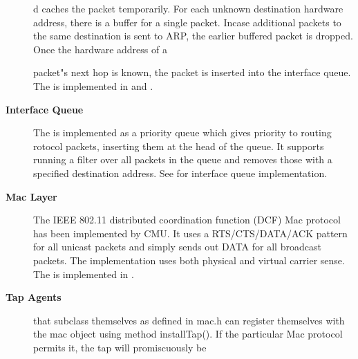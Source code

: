 \begin{description}
d caches the packet temporarily. For each unknown destination hardware address, there is a buffer for a single packet. Incase additional packets to the same destination is sent to ARP, the earlier buffered packet is dropped. Once the hardware address of a





















 packet"s next hop is known, the packet is inserted into the interface queue. The  is implemented in  and .

\item[{\bf Interface Queue}] The  is implemented as a priority queue which gives priority to routing 
rotocol packets, inserting them at the head of the queue. It supports
running a filter over all packets in the queue and removes those with
a specified destination address. See  for 
interface queue implementation.

\item[{\bf Mac Layer}] The IEEE 802.11 distributed coordination 
function (DCF) Mac protocol has been implemented by CMU. It uses a 
RTS/CTS/DATA/ACK pattern for all unicast packets and simply sends out
 DATA for all broadcast packets. The implementation uses both 
physical and virtual carrier sense. The  is implemented in .

\item[{\bf Tap Agents}]  that subclass themselves as  defined in mac.h can register themselves with the mac object using method installTap(). If the particular Mac protocol permits it, the tap will promiscuously be 






















\end{description}
